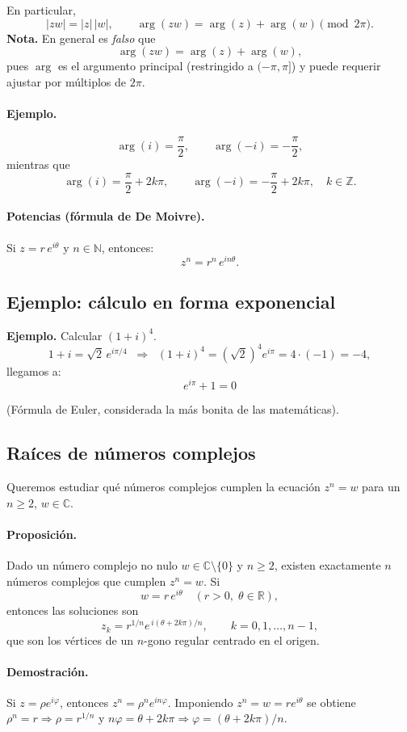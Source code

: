 \documentclass[a4paper,12pt]{article}
\begin{document}
En particular,
\[
|zw|=|z|\,|w|, \qquad \arg(zw)=\arg(z)+\arg(w)\pmod{2\pi}.
\]
\textbf{Nota.} En general es \emph{falso} que
\[
\arg(zw)=\arg(z)+\arg(w),
\]
pues \(\arg\) es el argumento principal (restringido a \((-\pi,\pi]\)) y puede requerir ajustar por múltiplos de \(2\pi\).

\paragraph{Ejemplo.}
\[
\arg(i)=\frac{\pi}{2}, \qquad \arg(-i)=-\frac{\pi}{2},
\]
mientras que
\[
\arg(i)=\frac{\pi}{2}+2k\pi, \qquad \arg(-i)=-\frac{\pi}{2}+2k\pi, \quad k\in\mathbb{Z}.
\]

\paragraph{Potencias (fórmula de De Moivre).}
Si \(z=r\,e^{i\theta}\) y \(n\in\mathbb{N}\), entonces:
\[
z^n=r^n\,e^{in\theta}.
\]

\subsection{Ejemplo: cálculo en forma exponencial}
\noindent\textbf{Ejemplo.} Calcular \((1+i)^4\).
\[
1+i=\sqrt{2}\,e^{i\pi/4}\;\;\Rightarrow\;\;(1+i)^4=(\sqrt{2})^4e^{i\pi}=4\cdot(-1)=-4,
\]
llegamos a:
\[
e^{i\pi}+1=0
\]

\medskip
{\small (Fórmula de Euler, considerada la más bonita de las matemáticas).}

\subsection{Raíces de números complejos}\label{subsec:raices}
Queremos estudiar qué números complejos cumplen la ecuación \(z^n=w\) para un \(n\ge 2\), \(w\in\mathbb{C}\).

\paragraph{Proposición.}
Dado un número complejo no nulo \(w\in\mathbb{C}\setminus\{0\}\) y \(n\ge 2\), existen exactamente \(n\) números complejos que cumplen \(z^n=w\). Si
\[
w=r\,e^{i\theta}\quad (r>0,\;\theta\in\mathbb{R}),
\]
entonces las soluciones son
\[
z_k=r^{1/n}e^{\,i(\theta+2k\pi)/n},\qquad k=0,1,\dots,n-1,
\]
que son los vértices de un \(n\)-gono regular centrado en el origen.

\paragraph{Demostración.}
Si \(z=\rho e^{i\varphi}\), entonces \(z^n=\rho^n e^{in\varphi}\).
Imponiendo \(z^n=w=r e^{i\theta}\) se obtiene \(\rho^n=r\Rightarrow \rho=r^{1/n}\) y
\(n\varphi=\theta+2k\pi\Rightarrow \varphi=(\theta+2k\pi)/n\).
\end{document}

